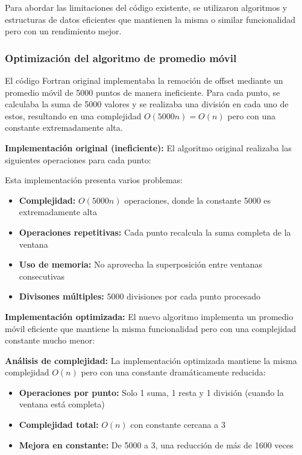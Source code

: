 \documentclass[12pt,a4paper]{article}
\begin{document}
Para abordar las limitaciones del código existente, se utilizaron algoritmos y estructuras de datos eficientes que mantienen la misma o similar funcionalidad pero con un
rendimiento mejor.

\subsubsection{Optimización del algoritmo de promedio móvil}

El código Fortran original implementaba la remoción de offset mediante un promedio
móvil de 5000 puntos de manera ineficiente. Para cada punto, se calculaba la suma de 5000
valores y se realizaba una división en cada uno de estos, resultando en una complejidad
$O(5000n) = O(n)$ pero con una constante extremadamente alta.

\textbf{Implementación original (ineficiente):} El algoritmo original realizaba las siguientes
operaciones para cada punto:

Esta implementación presenta varios problemas:

\begin{itemize}
    \item \textbf{Complejidad:} $O(5000n)$ operaciones, donde la constante 5000 es extremadamente alta
    \item \textbf{Operaciones repetitivas:} Cada punto recalcula la suma completa de la ventana
    \item \textbf{Uso de memoria:} No aprovecha la superposición entre ventanas consecutivas
    \item \textbf{Divisones múltiples:} 5000 divisiones por cada punto procesado
\end{itemize}

\textbf{Implementación optimizada:} El nuevo algoritmo implementa un promedio móvil eficiente que mantiene la misma funcionalidad pero con una complejidad constante mucho
menor:

\textbf{Análisis de complejidad:} La implementación optimizada mantiene la misma complejidad $O(n)$ pero con una constante dramáticamente reducida:

\begin{itemize}
    \item \textbf{Operaciones por punto:} Solo 1 suma, 1 resta y 1 división (cuando la ventana está
    completa)
    \item \textbf{Complejidad total:} $O(n)$ con constante cercana a 3
    \item \textbf{Mejora en constante:} De 5000 a 3, una reducción de más de 1600 veces
\end{itemize}
\end{document}
